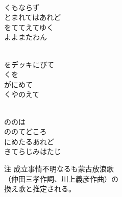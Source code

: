 \documentclass[10pt,b5j]{tarticle} %
\begin{document}
\begin{enumerate} %
    \setlength{\itemindent}{\itemmargin}
    \begin{minipage}[c]{\blocksize}
    
        \vspace{\linespace}
        \item~\\
        くもならず\\
        とまれてはあれど\\
        をててえてゆく\\
        よよまたわん

	\end{minipage}
	\begin{minipage}[c]{\blocksize}

        \vspace{\linespace}
        \item~\\
        をデッキにびて\\
        くを\\
        がにめて\\
        くやのえて
        
	\end{minipage}
	\begin{minipage}[c]{\blocksize}

        \vspace{\linespace}
        \item~\\
        ののは\\
        ののてどころ\\
        にめたるあれど\\
        きてらじみはたじ
    
    \end{minipage}
\end{enumerate} %
\begin{flushright}
        注 成立事情不明なるも蒙古放浪歌\\
        （仲田三孝作詞、川上義彦作曲）の\\
        換え歌と推定される。
\end{flushright}
\end{document}
